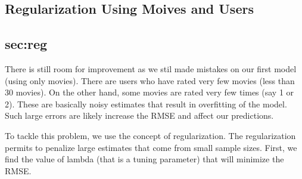 \documentclass[]{article}
\begin{document}
\subsection{Regularization Using Moives and Users}
\subsection{sec:reg}

There is still room for improvement as we stil made mistakes on our
first model (using only movies). There are users who have rated very few
movies (less than 30 movies). On the other hand, some movies are rated
very few times (say 1 or 2). These are basically noisy estimates that
result in overfitting of the model. Such large errors are likely
increase the RMSE and affect our predictions.

To tackle this problem, we use the concept of regularization. The
regularization permits to penalize large estimates that come from small
sample sizes. First, we find the value of lambda (that is a tuning
parameter) that will minimize the RMSE.
\end{document}
